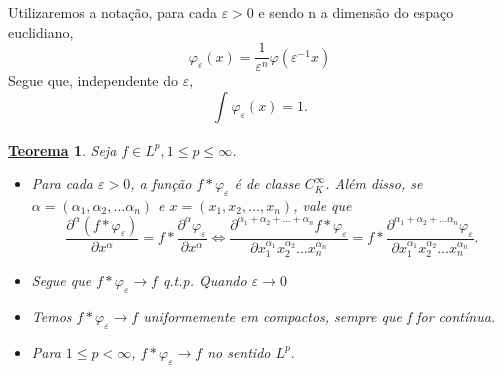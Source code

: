 \documentclass{article}
\newtheorem*{theorem*}{\underline{Teorema}}
\begin{document}
  Utilizaremos a notação, para cada \(\varepsilon  > 0\) e sendo n a dimensão do espaço euclidiano, 
    \[
      \varphi_{\varepsilon }(x) = \frac{1}{\varepsilon^{n} }\varphi (\varepsilon^{-1}x)
    \]
  Segue que, independente do \(\varepsilon \), 
    \[
      \int_{}^{}\varphi_{\varepsilon }(x) = 1.
    \]
 \begin{theorem*}
   Seja \(f\in L^{p}, 1\leq p\leq \infty\).
  \begin{itemize}
    \item[1)] Para cada \(\varepsilon > 0\), a função \(f*\varphi_{\varepsilon }\) é de classe \(C_{K}^{\infty}\). Além disso, se \(\alpha  = (\alpha_1, \alpha_2, \dotsc \alpha_n)\) e 
  \(x = (x_1, x_2, \dotsc , x_{n})\), vale que 
    \[
      \frac{\partial^{\alpha }(f*\varphi_{\varepsilon })}{\partial x^{\alpha }} = f*\frac{\partial^{\alpha }\varphi_{\varepsilon }}{\partial x^{\alpha }} \Longleftrightarrow \frac{\partial^{\alpha_1 + \alpha_2 + \dotsc + \alpha_{n}}f*\varphi_{\varepsilon}}{\partial x_{1}^{\alpha_1}x_{2}^{\alpha_2}\dotsc x_{n}^{\alpha_{n}}} = f* \frac{\partial^{\alpha_1 + \alpha_2 + \dotsc \alpha_{n}}\varphi_{\varepsilon }}{\partial x_1^{\alpha_1}x_{2}^{\alpha_2}\dotsc x_{n}^{\alpha_{n}}}.
    \]
    \item[2)] Segue que \(f*\varphi_{\varepsilon }\to f\) q.t.p. Quando \(\varepsilon \to 0\)
    \item[3)] Temos \(f*\varphi_{\varepsilon }\to f\) uniformemente em compactos, sempre que f for contínua.
    \item[4)] Para \(1\leq p < \infty\), \(f*\varphi_\varepsilon \to f\) no sentido \(L^{p}.\)
  \end{itemize}
 \end{theorem*}
\end{document}
